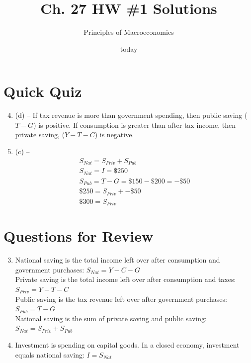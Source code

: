 \documentclass{article}
\title{Ch. 27 HW \#1 Solutions}
\author{Principles of Macroeconomics}
\date{today}
\begin{document}
\maketitle

\section*{Quick Quiz}

\begin{enumerate}

\setcounter{enumi}{3}

\item (d) -- If tax revenue is more than government spending, then public saving ($T - G$) is positive. If consumption is greater than after tax income, then private saving, ($Y - T - C$) is negative.

\item (c) --
	\begin{gather*}
	S_{Nat} = S_{Priv} + S_{Pub} \\
	S_{Nat} = I = \$250 \\
	S_{Pub} = T - G = \$150 -\$200 = -\$50 \\
	\$250 = S_{Priv} + -\$50 \\
	\$300 = S_{Priv}
	\end{gather*}
	
\end{enumerate}




\section*{Questions for Review}

\begin{enumerate}

\setcounter{enumi}{2}

\item National saving is the total income left over after consumption and government purchases: $S_{Nat} = Y - C - G$ \\
	Private saving is the total income left over after consumption and taxes: $S_{Priv} = Y - T - C$ \\
	Public saving is the tax revenue left over after government purchases: $S_{Pub} = T - G$ \\
	National saving is the sum of private saving and public saving: \\ $S_{Nat} = S_{Priv} + S_{Pub}$
	
\item Investment is spending on capital goods. In a closed economy, investment equals national saving: $I = S_{Nat}$

\end{enumerate}
\end{document}
